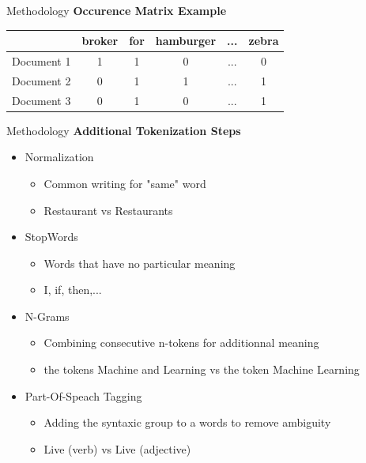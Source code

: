 \begin{frame}[label=metho]{Methodology}
	\textbf{Occurence Matrix Example}
	
	
	\begin{table}[H]
		\centering
		\begin{tabular}{|c|c|c|c|c|c|}
			\hline 
			&  broker  & for & hamburger & ... & zebra   \\ 
			\hline 
			Document 1 &    1 & 1 & 0 & ... & 0  \\ 
			\hline 
			Document 2&    0 & 1 & 1 & ... & 1 \\ 
			\hline 
			Document 3 &    0 & 1 & 0 & ... & 1  \\ 
			\hline 
			
		\end{tabular} 
		
	\end{table}
	
\end{frame}

\begin{frame}[label=metho]{Methodology}
	\textbf{Additional Tokenization Steps}
	\begin{itemize}
		\item Normalization
		\begin{itemize}
			\item Common writing for "same" word
			\item Restaurant vs Restaurants
		\end{itemize}
		
		\item StopWords
		\begin{itemize}
			\item Words that have no particular meaning
			\item I, if, then,...
		\end{itemize}
		
		\item N-Grams
		\begin{itemize}
			\item Combining consecutive n-tokens for additionnal meaning
			\item the tokens Machine and Learning vs the token Machine Learning
		\end{itemize}
		
		\item Part-Of-Speach Tagging
		\begin{itemize}
			\item Adding the syntaxic group to a words to remove ambiguity
			\item Live (verb) vs Live (adjective)
		\end{itemize}
		
	\end{itemize}
\end{frame}



